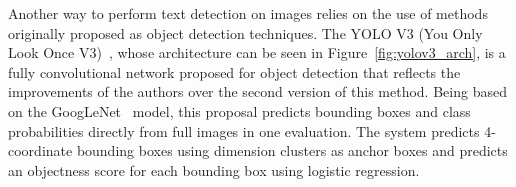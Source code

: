         Another way to perform text detection on images relies on the use of methods originally proposed as object detection techniques. The YOLO V3 (You Only Look Once V3)~\cite{Redmon2018CoRR}, whose architecture can be seen in Figure~\ref{fig:yolov3_arch}, is a fully convolutional network proposed for object detection that reflects the improvements of the authors over the second version of this method. Being based on the GoogLeNet~\cite{googlenet} model, this proposal predicts bounding boxes and class probabilities directly from full images in one evaluation. The system predicts 4-coordinate bounding boxes using dimension clusters as anchor boxes and predicts an objectness score for each bounding box using logistic regression. 
        
      


